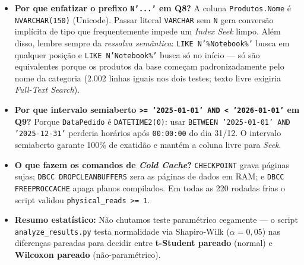 \documentclass[10pt,a4paper]{article}
\begin{document}
\begin{expBox}
  \begin{itemize}[leftmargin=14pt,itemsep=2pt,topsep=1pt]
    \item \textbf{Por que enfatizar o prefixo \texttt{N'...'} em Q8?} A coluna \texttt{Produtos.Nome} é \texttt{NVARCHAR(150)} (Unicode). Passar literal \texttt{VARCHAR} sem \texttt{N} gera conversão implícita de tipo que frequentemente impede um \emph{Index Seek} limpo. Além disso, lembre sempre da \emph{ressalva semântica}: \texttt{LIKE N'\%Notebook\%'} busca em qualquer posição e \texttt{LIKE N'Notebook\%'} busca só no início — só são equivalentes porque os produtos da base começam padronizadamente pelo nome da categoria (2.002 linhas iguais nos dois testes; texto livre exigiria \emph{Full-Text Search}).
    \item \textbf{Por que intervalo semiaberto \texttt{>= '2025-01-01' AND < '2026-01-01'} em Q9?} Porque \texttt{DataPedido} é \texttt{DATETIME2(0)}: usar \texttt{BETWEEN '2025-01-01' AND '2025-12-31'} perderia horários após \texttt{00:00:00} do dia 31/12. O intervalo semiaberto garante 100\% de exatidão e mantém a coluna livre para \emph{Seek}.
    \item \textbf{O que fazem os comandos de \emph{Cold Cache}?} \texttt{CHECKPOINT} grava páginas sujas; \texttt{DBCC DROPCLEANBUFFERS} zera as páginas de dados em RAM; e \texttt{DBCC FREEPROCCACHE} apaga planos compilados. Em todas as 220 rodadas frias o script validou \texttt{physical\_reads >= 1}.
    \item \textbf{Resumo estatístico:} Não chutamos teste paramétrico cegamente — o script \texttt{analyze\_results.py} testa normalidade via Shapiro-Wilk ($\alpha=0{,}05$) nas diferenças pareadas para decidir entre \textbf{t-Student pareado} (normal) e \textbf{Wilcoxon pareado} (não-paramétrico).
  \end{itemize}
\end{expBox}
\end{document}
